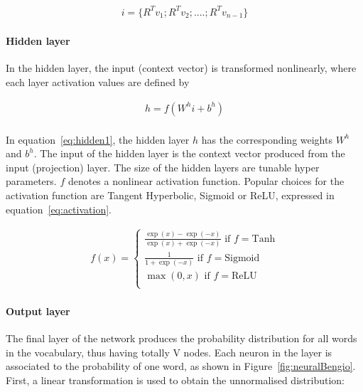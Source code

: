 \begin{equation}
\begin{aligned}
i = \{R^T v_1; R^T v_2; .... ; R^T v_{n-1} \}
\end{aligned}  
\end{equation}


\paragraph{Hidden layer}
In the hidden layer, the input (context vector) is transformed nonlinearly, where each layer activation values are defined by

\begin{equation}
\begin{aligned}
h = f(W^h i + b^h) \\
\label{eq:hidden1}
\end{aligned}  
\end{equation}

In equation~\ref{eq:hidden1}, the hidden layer $h$ has the corresponding weights $W^h$ and $b^h$. The input of the hidden layer is the context vector produced from the input (projection) layer. The size of the hidden layers are tunable hyper parameters. $f$ denotes a nonlinear activation function. Popular choices for the activation function are Tangent Hyperbolic, Sigmoid or ReLU, expressed in equation~\ref{eq:activation}. 


\begin{equation}
\begin{aligned}
f(x) = 
\begin{cases}
\frac{\exp (x) - \exp (-x)}{\exp (x) + \exp (-x)}    \text{    if } f = \text{Tanh} \\
\frac{1}{1 + \exp(-x)}                \text{     if } f = \text{Sigmoid} \\
\max(0, x) \text{     if } f = \text{ReLU} \\
\end{cases}
\label{eq:activation}
\end{aligned}
\end{equation}

\paragraph{Output layer}
The final layer of the network produces the probability distribution for all words in the vocabulary, thus having totally V nodes. Each neuron in the layer is associated to the probability of one word, as shown in Figure~\ref{fig:neuralBengio}. First, a linear transformation is used to obtain the unnormalised distribution:

